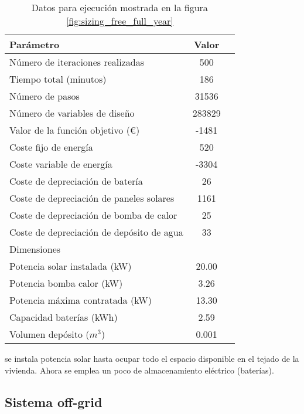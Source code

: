 \begin{table}[ht]
	\centering
	\caption{Datos para ejecución mostrada en la figura \ref{fig:sizing_free_full_year}}
	\label{tab:sizing_free_full_year}
	\begin{tabular}{@{}lcc@{}}
		\toprule
		Parámetro                                 & Valor  \\
		\midrule
		Número de iteraciones realizadas          & 500    \\
		Tiempo total (minutos)                    & 186    \\
		Número de pasos                           & 31536  \\
		Número de variables de diseño             & 283829 \\
		\midrule
		Valor de la función objetivo (€)          & -1481  \\
		\midrule
		Coste fijo de energía                     & 520    \\
		Coste variable de energía                 & -3304  \\
		Coste de depreciación de batería          & 26     \\
		Coste de depreciación de paneles solares  & 1161   \\
		Coste de depreciación de bomba de calor   & 25     \\
		Coste de depreciación de depósito de agua & 33     \\
		\midrule
		Dimensiones                               &        \\
		\midrule
		Potencia solar instalada (kW)             & 20.00  \\
		Potencia bomba calor (kW)                 & 3.26   \\
		Potencia máxima contratada (kW)           & 13.30  \\
		Capacidad baterías (kWh)                  & 2.59   \\
		Volumen depósito ($m^3$)                  & 0.001  \\
		\bottomrule
	\end{tabular}
\end{table}

se instala potencia solar hasta ocupar todo el espacio disponible en el tejado
de la vivienda. Ahora se emplea un poco de almacenamiento eléctrico (baterías).


\clearpage
\subsection{Sistema off-grid}
